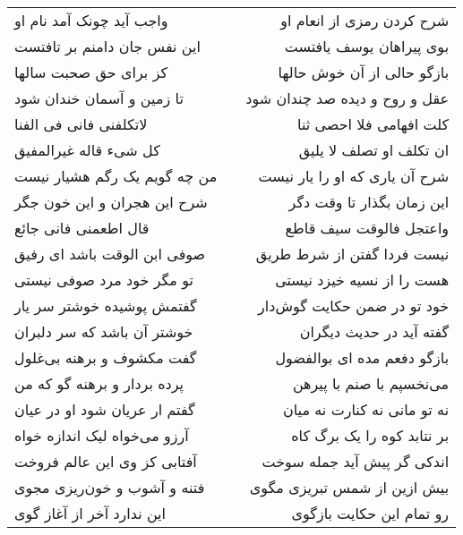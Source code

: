 \begin{center}
\begin{longtable}{l p{0.5cm} r}
واجب آید چونک آمد نام او
&&
شرح کردن رمزی از انعام او
\\
این نفس جان دامنم بر تافتست
&&
بوی پیراهان یوسف یافتست
\\
کز برای حق صحبت سالها
&&
بازگو حالی از آن خوش حالها
\\
تا زمین و آسمان خندان شود
&&
عقل و روح و دیده صد چندان شود
\\
لاتکلفنی فانی فی الفنا
&&
کلت افهامی فلا احصی ثنا
\\
کل شیء قاله غیرالمفیق
&&
ان تکلف او تصلف لا یلیق
\\
من چه گویم یک رگم هشیار نیست
&&
شرح آن یاری که او را یار نیست
\\
شرح این هجران و این خون جگر
&&
این زمان بگذار تا وقت دگر
\\
قال اطعمنی فانی جائع
&&
واعتجل فالوقت سیف قاطع
\\
صوفی ابن الوقت باشد ای رفیق
&&
نیست فردا گفتن از شرط طریق
\\
تو مگر خود مرد صوفی نیستی
&&
هست را از نسیه خیزد نیستی
\\
گفتمش پوشیده خوشتر سر یار
&&
خود تو در ضمن حکایت گوش‌دار
\\
خوشتر آن باشد که سر دلبران
&&
گفته آید در حدیث دیگران
\\
گفت مکشوف و برهنه بی‌غلول
&&
بازگو دفعم مده ای بوالفضول
\\
پرده بردار و برهنه گو که من
&&
می‌نخسپم با صنم با پیرهن
\\
گفتم ار عریان شود او در عیان
&&
نه تو مانی نه کنارت نه میان
\\
آرزو می‌خواه لیک اندازه خواه
&&
بر نتابد کوه را یک برگ کاه
\\
آفتابی کز وی این عالم فروخت
&&
اندکی گر پیش آید جمله سوخت
\\
فتنه و آشوب و خون‌ریزی مجوی
&&
بیش ازین از شمس تبریزی مگوی
\\
این ندارد آخر از آغاز گوی
&&
رو تمام این حکایت بازگوی
\\
\end{longtable}
\end{center}
